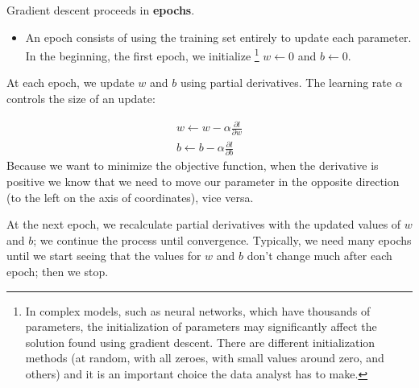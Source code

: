 \documentclass[9pt,dvipsnames]{beamer}
\begin{document}
\begin{frame}
	Gradient descent proceeds in \textbf{epochs}. 
	\begin{itemize}
		\item An epoch consists of using the training set entirely to update each parameter. In the beginning, the first epoch, we initialize \footnote{In complex models, such as neural networks, which have thousands of parameters, the initialization of parameters may significantly affect the solution found using gradient descent. There are different initialization methods (at random, with all zeroes, with small values around zero, and others) and it is an important choice the data analyst has to make.} $ w \leftarrow 0$ and $b \leftarrow 0$. 
	\end{itemize}
	At each epoch, we update $w$ and $b$ using partial derivatives. The learning rate $\alpha$ controls the size of an update:
	
	$$
	\begin{gathered}
		w \leftarrow w-\alpha \frac{\partial l}{\partial w} \\
		b \leftarrow b-\alpha \frac{\partial l}{\partial b}
	\end{gathered}
	$$
	Because we want to minimize the objective function, when the derivative is positive we know that we need to move our parameter in the opposite direction (to the left on the axis of coordinates), vice versa. 
	
	At the next epoch, we recalculate partial derivatives with the updated values of $w$ and $b$; we continue the process until convergence. Typically, we need many epochs until we start seeing that the values for $w$ and $b$ don't change much after each epoch; then we stop.
\end{frame}
\end{document}
